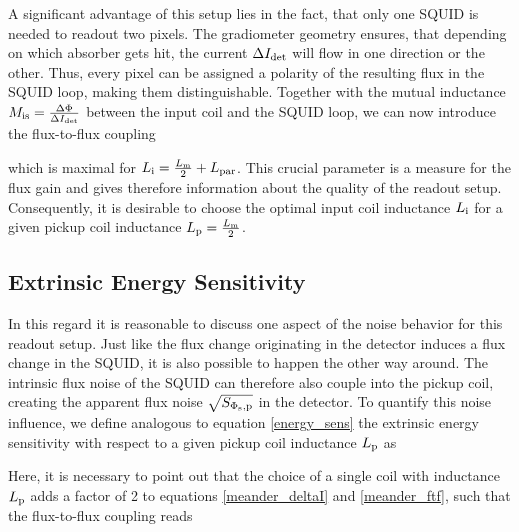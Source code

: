 
A significant advantage of this setup lies in the fact, that only one SQUID is needed to readout two pixels. The gradiometer geometry ensures, that depending on which absorber gets hit, the current $\Delta I_{\rm det}$ will flow in one direction or the other. Thus, every pixel can be assigned a polarity of the resulting flux in the SQUID loop, making them distinguishable. Together with the mutual inductance $M_{\rm is}=\frac{\Delta\Phi}{\Delta I_{\rm det}}$ between the input coil and the SQUID loop, we can now introduce the flux-to-flux coupling 


which is maximal for $L_{\rm i}=\frac{L_{\rm m}}{2}+L_{\rm par}$. This crucial parameter is a measure for the flux gain and gives therefore information about the quality of the readout setup. Consequently, it is desirable to choose the optimal input coil inductance $L_{\rm i}$ for a given pickup coil inductance $L_{\rm p}=\frac{L_{\rm m}}{2}$.

\subsection{Extrinsic Energy Sensitivity}

In this regard it is reasonable to discuss one aspect of the noise behavior for this readout setup. Just like the flux change originating in the detector induces a flux change in the SQUID, it is also possible to happen the other way around. The intrinsic flux noise of the SQUID can therefore also couple into the pickup coil, creating the apparent flux noise $\sqrt{S_{\rm\Phi_{\rm s},p}}$ in the detector. To quantify this noise influence, we define analogous to equation \ref{energy_sens} the extrinsic energy sensitivity with respect to a given pickup coil inductance $L_{\rm p}$ as \cite{Knuutila1988}


Here, it is necessary to point out that the choice of a single coil with inductance $L_{\rm p}$ adds a factor of 2 to equations \ref{meander_deltaI} and \ref{meander_ftf}, such that the flux-to-flux coupling reads


